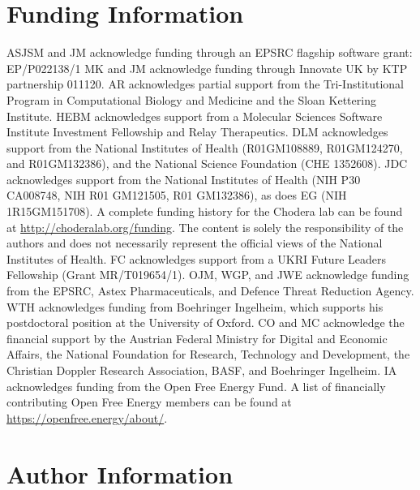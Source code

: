 \documentclass[9pt,bestpractices]{livecoms}
\begin{document}
\section*{Funding Information}
ASJSM and JM acknowledge funding through an EPSRC flagship software grant: EP/P022138/1
MK and JM acknowledge funding through Innovate UK by KTP partnership 011120.
AR acknowledges partial support from the Tri-Institutional Program in Computational Biology and Medicine and the Sloan Kettering Institute.
HEBM acknowledges support from a Molecular Sciences Software Institute Investment Fellowship and Relay Therapeutics.
DLM acknowledges support from the National Institutes of Health (R01GM108889, R01GM124270, and R01GM132386), and the National Science Foundation (CHE 1352608).
JDC acknowledges support from the National Institutes of Health (NIH P30 CA008748, NIH R01 GM121505, R01 GM132386), as does EG (NIH 1R15GM151708).
A complete funding history for the Chodera lab can be found at \url{http://choderalab.org/funding}.
The content is solely the responsibility of the authors and does not necessarily represent the official views of the National Institutes of Health.
FC acknowledges support from a UKRI Future Leaders Fellowship (Grant MR/T019654/1).
OJM, WGP, and JWE acknowledge funding from the EPSRC, Astex Pharmaceuticals, and Defence Threat Reduction Agency.
WTH acknowledges funding from Boehringer Ingelheim, which supports his postdoctoral position at the University of Oxford.
CO and MC acknowledge the financial support by the Austrian Federal Ministry for Digital and Economic Affairs, the National Foundation for Research, Technology and Development, the Christian Doppler Research Association, BASF, and Boehringer Ingelheim.
IA acknowledges funding from the Open Free Energy Fund. A list of financially contributing Open Free Energy members can be found at \url{https://openfree.energy/about/}.


\section*{Author Information}
\makeorcid



\end{document}

